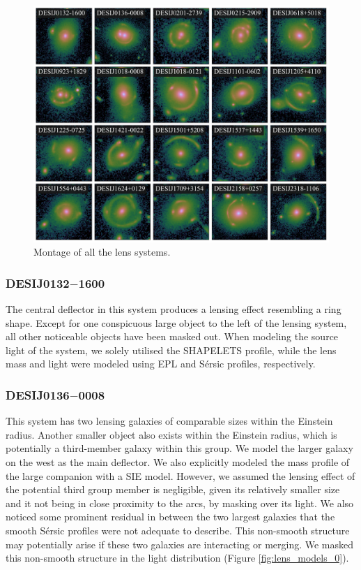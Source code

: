 \documentclass{aa}
\begin{document}

\begin{figure}
	\includegraphics[width=\textwidth]{figures/lens_montage.pdf}
	\caption{\label{fig:montage}
	Montage of all the lens systems.
	}
\end{figure}

\subsubsection{DESIJ0132$-$1600}

The central deflector in this system produces a lensing effect resembling a ring shape. Except for one conspicuous large object to the left of the lensing system, all other noticeable objects have been masked out. When modeling the source light of the system, we solely utilised the SHAPELETS profile, while the lens mass and light were modeled using EPL and S\'ersic profiles, respectively.

\subsubsection{DESIJ0136$-$0008}

This system has two lensing galaxies of comparable sizes within the Einstein radius. Another smaller object also exists within the Einstein radius, which is potentially a third-member galaxy within this group. We model the larger galaxy on the west as the main deflector. We also explicitly modeled the mass profile of the large companion with a SIE model. However, we assumed the lensing effect of the potential third group member is negligible, given its relatively smaller size and it not being in close proximity to the arcs, by masking over its light. We also noticed some prominent residual in between the two largest galaxies that the smooth S\'ersic profiles were not adequate to describe. This non-smooth structure may potentially arise if these two galaxies are interacting or merging. We masked this non-smooth structure in the light distribution (Figure \ref{fig:lens_models_0}).
\end{document}

